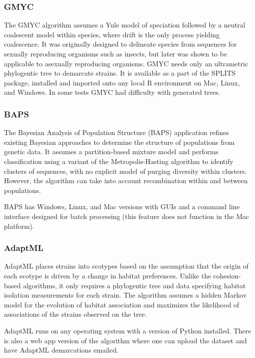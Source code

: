 \subsubsection*{GMYC~\cite{barraclough2009inferring}}
The GMYC algorithm assumes a Yule model of speciation followed by a neutral coalescent model within species, where drift is the only process yielding coalescence.
It was originally designed to delineate species from sequences for sexually reproducing organisms such as insects, but later was shown to be applicable to asexually reproducing organisms.
GMYC needs only an ultrametric phylogentic tree to demarcate strains.
It is available as a part of the SPLITS package, installed and imported onto any local R environment on Mac, Linux, and Windows.
In some tests GMYC had difficulty with generated trees.

\subsubsection*{BAPS~\cite{corander2007bayesian}}
The Bayesian Analysis of Population Structure (BAPS) application refines existing Bayesian approaches to determine the structure of populations from genetic data.
It assumes a partition-based mixture model and performs classification using a variant of the Metropolis-Hasting algorithm to identify clusters of sequences, with no explicit model of purging diversity within clusters.
However, the algorithm can take into account recombination within and between populations.

BAPS has Windows, Linux, and Mac versions with GUIs and a command line interface designed for batch processing (this feature does not function in the Mac platform).

\subsubsection*{AdaptML~\cite{hunt2008resource}}
AdaptML places strains into ecotypes based on the assumption that the origin of each ecotype is driven by a change in habitat preferences.
Unlike the cohesion-based algorithms, it only requires a phylogentic tree and data specifying habitat isolation measurements for each strain.
The algorithm assumes a hidden Markov model for the evolution of habitat association and maximizes the likelihood of associations of the strains observed on the tree.

AdaptML runs on any operating system with a  version of Python installed. There is also a web app version of the algorithm where one can upload the dataset and have AdaptML demarcations emailed.

